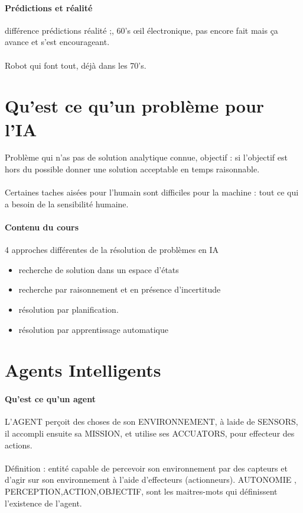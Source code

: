\documentclass{article}
\begin{document}
\paragraph{Prédictions et réalité} différence prédictions réalité ;,  60's œil électronique, pas encore fait mais ça avance et s'est encourageant.\\\\ Robot qui font tout, déjà dans les 70's.
\section{Qu'est ce qu'un problème pour l'IA}Problème qui n'as pas de solution analytique connue, objectif : si l'objectif est hors du possible donner une solution acceptable en temps raisonnable.\\\\Certaines taches aisées pour l'humain sont difficiles pour la machine : tout ce qui a besoin de la sensibilité humaine.

\paragraph{Contenu du cours} 4 approches différentes de la résolution de problèmes en IA
\begin{itemize}
\item recherche de solution dans un espace d'états
\item recherche par raisonnement et en présence d'incertitude
\item résolution par planification.
\item résolution par apprentissage automatique
\end{itemize}

\section{Agents Intelligents}
\paragraph{Qu'est ce qu'un agent}
L'AGENT perçoit des choses de son ENVIRONNEMENT, à laide de SENSORS,  il accompli ensuite sa MISSION, et utilise ses ACCUATORS, pour effecteur des actions.\\\\Définition : entité capable de percevoir son environnement par des capteurs et d'agir sur son environnement à l'aide d’effecteurs (actionneurs). AUTONOMIE , PERCEPTION,ACTION,OBJECTIF, sont les maitres-mots qui définissent l'existence de l'agent.
\end{document}

